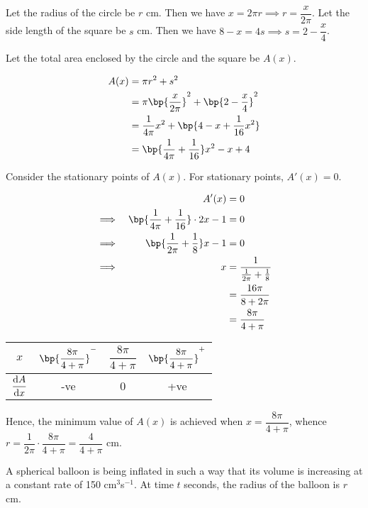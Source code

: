 \documentclass{echw}
\begin{document}
    \solution
        Let the radius of the circle be $r$ cm. Then we have $x = 2\pi r \implies r = \dfrac{x}{2\pi}$. Let the side length of the square be $s$ cm. Then we have $8-x=4s \implies s = 2-\dfrac{x}4$.

        Let the total area enclosed by the circle and the square be $A(x)$.

        \begin{align*}
            A(x) &= \pi r^2 + s^2\\
            &= \pi \bp{\dfrac{x}{2\pi}}^2 + \bp{2-\dfrac{x}4}^2\\
            &= \dfrac1{4\pi}x^2 + \bp{4 - x + \dfrac1{16}x^2}\\
            &= \bp{\dfrac1{4\pi} + \dfrac1{16}}x^2 - x + 4
        \end{align*}

        Consider the stationary points of $A(x)$. For stationary points, $A'(x) = 0$.

        \begin{alignat*}{2}
            &&A'(x) &= 0\\
            \implies&&\bp{\dfrac1{4\pi} + \dfrac1{16}}\cdot 2x - 1 &= 0\\
            \implies&&\bp{\dfrac1{2\pi} + \dfrac1{8}}x - 1 &= 0\\
            \implies&& x &= \dfrac1{\tfrac1{2\pi} + \tfrac1{8}}\\
            && &= \dfrac{16\pi}{8 + 2\pi}\\
            && &=\dfrac{8\pi}{4 + \pi}
        \end{alignat*}

        \begin{table}[h]
            \centering
            \begin{tabular}{|c|c|c|c|}
            \hline
            $x$ & $\bp{\dfrac{8\pi}{4 + \pi}}^-$ & $\dfrac{8\pi}{4 + \pi}$ & $\bp{\dfrac{8\pi}{4 + \pi}}^+$ \\\hline
            $\dfrac{\mathrm{d} A}{\mathrm{d} x}$ & -ve   & 0 & +ve   \\[1ex]\hline
            \end{tabular}
        \end{table}

        Hence, the minimum value of $A(x)$ is achieved when $x = \dfrac{8\pi}{4 + \pi}$, whence $r = \dfrac{1}{2\pi} \cdot \dfrac{8\pi}{4 + \pi} = \dfrac{4}{4+\pi}$ cm.

    \problem{}
        A spherical balloon is being inflated in such a way that its volume is increasing at a constant rate of 150 cm$^3$s$^{-1}$. At time $t$ seconds, the radius of the balloon is $r$ cm.
\end{document}
